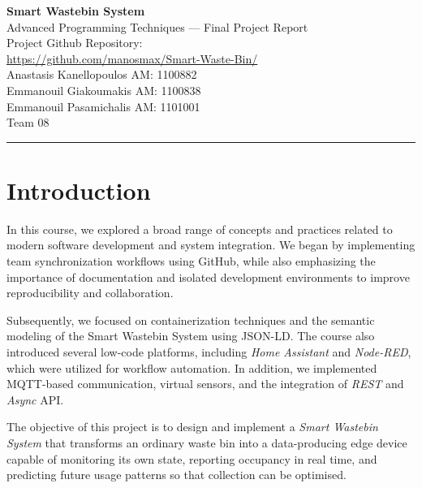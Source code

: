 \documentclass[10pt,a4paper]{article}
\begin{document}
\begin{center}
{\fontsize{14pt}{17pt}\selectfont\bfseries Smart Wastebin System}\\[4pt]
{\fontsize{10pt}{12pt}\selectfont\color{gray}
Advanced Programming Techniques --- Final Project Report\\[2pt]
Project Github Repository:\\[2pt]
\url{https://github.com/manosmax/Smart-Waste-Bin/}\\[2pt]
Anastasis Kanellopoulos \textbullet{} AM: 1100882\\[2pt]
Emmanouil Giakoumakis \textbullet{} AM: 1100838\\[2pt]
Emmanouil Pasamichalis \textbullet{} AM: 1101001\\[2pt]
Team 08
}
\end{center}
\vspace{-4pt}
\rule{\linewidth}{0.6pt}
\vspace{4pt}

\section{Introduction}

In this course, we explored a broad range of concepts and practices related to modern software development and system integration. We began by implementing team synchronization workflows using GitHub, while also emphasizing the importance of documentation and isolated development environments to improve reproducibility and collaboration.

Subsequently, we focused on containerization techniques and the semantic modeling of the Smart Wastebin System using JSON-LD. The course also introduced several low-code platforms, including \textit{Home Assistant} and \textit{Node-RED}, which were utilized for workflow automation. In addition, we implemented MQTT-based communication, virtual sensors, and the integration of \textit{REST} and \textit{Async} API.

The objective of this project is to design and implement a \textit{Smart Wastebin System}
that transforms an ordinary waste bin into a data-producing edge device capable of
monitoring its own state, reporting occupancy in real time, and predicting future usage
patterns so that collection can be optimised.
\end{document}
